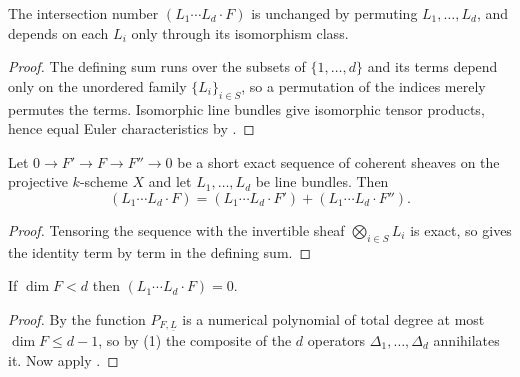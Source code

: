 \begin{lemma}[Symmetry]\label{lem:deg-intersection-symmetric}
\leanok
{}
The intersection number $(L_1\cdots L_d\cdot F)$ is unchanged by permuting
$L_1,\dots,L_d$, and depends on each $L_i$ only through its isomorphism class.
\end{lemma}
\begin{proof}
\leanok
The defining sum runs over the subsets of $\{1,\dots,d\}$ and its terms depend
only on the unordered family $\{L_i\}_{i\in S}$, so a permutation of the
indices merely permutes the terms.  Isomorphic line bundles give isomorphic
tensor products, hence equal Euler characteristics by
.
\end{proof}

\begin{lemma}
\label{lem:deg-intersection-additive}
Let $0\to F'\to F\to F''\to0$ be a short exact sequence of coherent sheaves on
the projective $k$-scheme $X$ and let $L_1,\dots,L_d$ be line bundles.  Then
\[
  (L_1\cdots L_d\cdot F)=(L_1\cdots L_d\cdot F')+(L_1\cdots L_d\cdot F'').
\]
\end{lemma}
\begin{proof}
Tensoring the sequence with the invertible sheaf $\bigotimes_{i\in S}L_i$ is
exact, so  gives the identity term by term in the
defining sum.
\end{proof}

\begin{lemma}
\label{lem:deg-intersection-small-support}
If $\dim F<d$ then $(L_1\cdots L_d\cdot F)=0$.
\end{lemma}
\begin{proof}
By  the function $P_{F,\underline L}$ is a numerical
polynomial of total degree at most $\dim F\leq d-1$, so by
(1) the composite of the $d$ operators
$\Delta_1,\dots,\Delta_d$ annihilates it.  Now apply
.
\end{proof}

